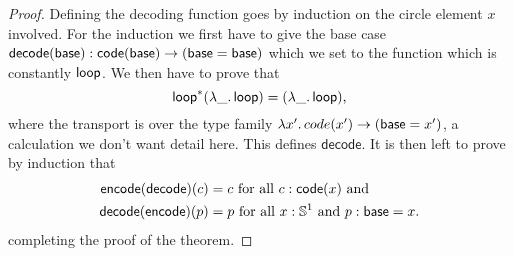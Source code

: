 \begin{proof}
Defining the decoding function goes by induction on the circle element
$x$ involved.
For the induction we first have to give the base case
$\mathsf{decode}(\mathsf{base}) : \mathsf{code}(\mathsf{base}) \to (\mathsf{base} = \mathsf{base})$ which we set to the function which is
constantly $\mathsf{loop}$.
We then have to prove that
\begin{equation*}
\mathsf{loop}^*(\lambda \_.\, \mathsf{loop}) = (\lambda\_.\, \mathsf{loop}) \text{,}
\end{equation*}
where the transport is over the type family $\lambda x'.\, code(x') \to (\mathsf{base} = x')$,
a calculation we don't want detail here. This defines $\mathsf{decode}$.
It is then left to prove by induction that
\begin{align*}
\mathsf{encode}(\mathsf{decode})(c) &= c \text{ for all $c : \mathsf{code}(x)$ and} \\
\mathsf{decode}(\mathsf{encode})(p) &= p \text{ for all $x : \mathbb{S}^1$ and $p : \mathsf{base} = x$.}
\end{align*}
completing the proof of the theorem.
\end{proof}

